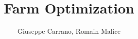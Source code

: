 \documentclass{article}
\title{Farm Optimization}
\author{Giuseppe Carrano, Romain Malice}
\begin{document}
\maketitle{}


\end{document}

